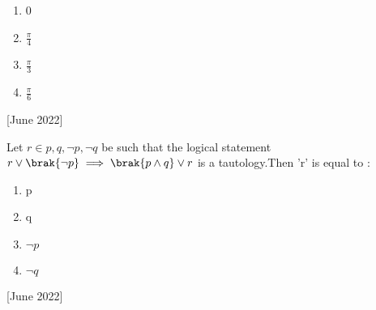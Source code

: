     \begin{enumerate}
        \item 0
        \item $\frac{\pi}{4}$
        \item $\frac{\pi}{3}$
        \item $\frac{\pi}{6}$
    \end{enumerate}
    \hfill{[June 2022]}
    \item[5.] Let $r \in {p,q,\neg p,\neg q}$ be such that the logical statement $r\lor \brak{\neg p}\implies\brak{p\land q}\lor r$ is a tautology.Then 'r' is equal to :
    \begin{enumerate}
        \item p
        \item q
        \item $\neg p$
        \item $\neg q$
    \end{enumerate}
    \hfill{[June 2022]}
